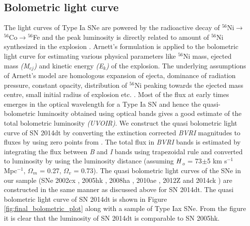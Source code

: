 \documentclass[fleqn,usenatbib]{mnras}
\begin{document}
\subsection{Bolometric light curve}

The light curves of Type Ia SNe are powered by the radioactive decay of $^{56}$Ni$\rightarrow$$^{56}$Co$\rightarrow$$^{56}$Fe
and the peak luminosity is directly related to amount of $^{56}$Ni synthesized in the explosion \citep{1982ApJ...253..785A}. Arnett's formulation is applied to the bolometric light curve for estimating various physical parameters like $^{56}$Ni mass, ejected mass {\it (M$_{ej}$)} and kinetic energy {\it (E$_k$)} of the explosion. The underlying assumptions of Arnett's model are homologous expansion of ejecta, dominance of radiation pressure, constant opacity, distribution of $^{56}$Ni peaking towards the ejected mass centre, small initial radius of explosion etc. \citep{1982ApJ...253..785A}. Most of the flux at early times emerges in the optical wavelength for a Type Ia SN and hence the quasi-bolometric luminosity obtained using optical bands gives a good estimate of the total bolometric luminosity {\it (UVOIR)}. We construct the quasi bolometric light curve of SN 2014dt by converting the extinction corrected {\it BVRI} magnitudes to fluxes by using zero points from \cite{1998A&A...333..231B}. The total flux in {\it BVRI} bands is estimated by integrating the flux between
{\it B} and {\it I} bands using trapezoidal rule and converted to luminosity by using the luminosity distance (assuming $\it{H}$$_o$ = 73$\pm$5 
km s$^{-1}$ Mpc$^{-1}$, $\Omega$$_m$ = 0.27,  $\Omega$$_v$ = 0.73). The quasi bolometric light curves of the SNe in our sample (SNe 2002cx \citep{2003PASP..115..453L}, 2005hk \citep{2008ApJ...680..580S}, 2008ha \citep{2009AJ....138..376F}, 2010ae \citep{2014A&A...561A.146S}, 2012Z \citep{2015A&A...573A...2S,2015ApJ...806..191Y} and 2014ck \citep{2016MNRAS.459.1018T}) are constructed in the same manner as discussed above for SN 2014dt. The quasi bolometric light curve of SN 2014dt is shown in Figure \ref{fig:final_bolometric_plot} along with a sample of Type Iax SNe. From the figure it is clear that the luminosity of SN 2014dt is comparable to SN 2005hk.
\end{document}
